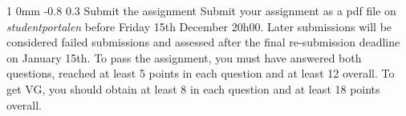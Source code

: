 \documentclass[11pt]{article}
\makeatletter
\renewcommand{\section}{\@startsection
{section}%
{1}%
{0mm}%
{-0.8\baselineskip}%
{0.3\baselineskip}%
{\bfseries\large}}%
\makeatother
\begin{document}
\section{Submit the assignment}
\noindent
Submit your assignment as a pdf file on \textit{studentportalen}
before Friday 15th December 20h00. Later submissions will be
considered failed submissions and assessed after the final
re-submission deadline on January 15th. To pass the assignment, you
must have answered both questions, reached at least 5 points in each
question and at least 12 overall.  To get VG, you should obtain at
least 8 in each question and at least 18 points overall.
  
\end{document}
